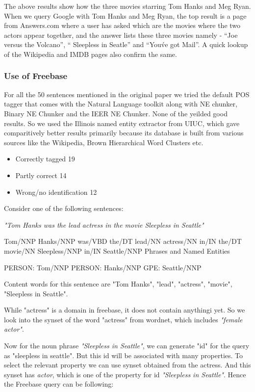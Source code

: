 \documentclass[12pt]{article}
\begin{document}
The above results show how the three movies starring Tom Hanks and Meg Ryan.
When we query Google with Tom Hanks and Meg Ryan, the top result is a page from
Answers.com where a user has asked which are the movies where the two actors
appear together, and the answer lists these three movies namely - ``Joe versus
the Volcano'', `` Sleepless in Seatle'' and ``You\'ve got Mail''. A quick lookup
of the Wikipedia and IMDB pages also confirm the same. 


\subsubsection{Use of Freebase}

For all the 50 sentences mentioned in the original paper we tried the default POS tagger that comes with the Natural Language toolkit along with NE chunker, Binary NE Chunker and the IEER NE Chunker. None of the yeilded good results. So we used the Illinois named entity extractor from UIUC, which gave comparitively better results primarily because its database is built from various sources like the Wikipedia, Brown Hierarchical Word Clusters etc. 

\begin{itemize}
\item Correctly tagged 19
\item Partly correct 14	
\item Wrong/no identification 12
\end{itemize}



Consider one of the following sentences:

\emph{"Tom Hanks was the lead actress in the movie Sleepless in Seattle"}

Tom/NNP Hanks/NNP was/VBD the/DT lead/NN actress/NN in/IN the/DT movie/NN Sleepless/NNP in/IN Seattle/NNP
Phrases and Named Entities

PERSON:
    Tom/NNP
PERSON:
    Hanks/NNP
GPE:
    Seattle/NNP

Content words for this sentence are "Tom Hanks", "lead", "actress", "movie", "Sleepless in Seattle". 

While "actress" is a domain in freebase, it does not contain anythingi yet. So we look into the synset of the word "actress" from wordnet, which includes \emph{"female actor"}.

Now for the noun phrase \emph{"Sleepless in Seattle"}, we can generate "id" for the query as "sleepless in seattle". But this id will be associated with many properties. To select the relevant property we can use synset obtained from the actress. And this synset has {\em actor}, which is one of the property for id {\em "Sleepless in Seattle"}. Hence the Freebase query can be following:
\end{document}
